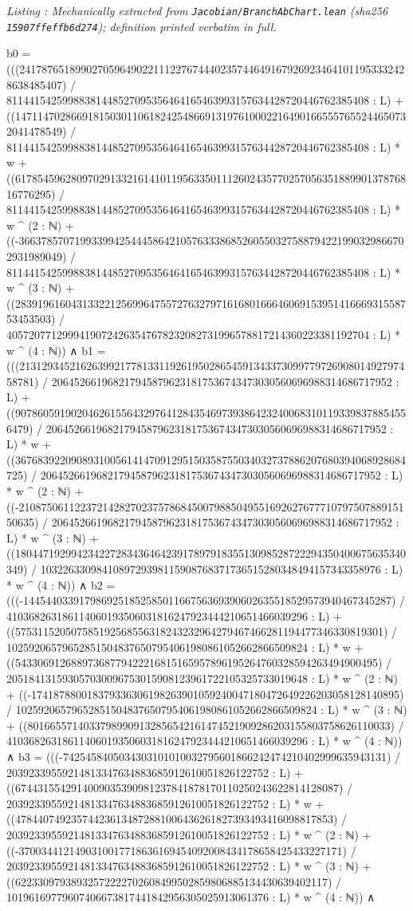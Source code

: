 \documentclass[a4paper,11pt]{article}
\newcounter{leanlisting}
\newenvironment{leanlisting}[2]{%
  \refstepcounter{leanlisting}\label{#2}%
  \begin{center}\textit{\small Listing \theleanlisting: #1}\end{center}%
  \Verbatim[breaklines=true,breakanywhere=true,fontsize=\footnotesize,frame=single,framesep=4pt,rulecolor=\color{gray!50},fillcolor=\color{gray!5}]%
}{%
  \endVerbatim%
}
\theoremstyle{plain}
\theoremstyle{definition}
\theoremstyle{remark}
\begin{document}
\begin{leanlisting}{Mechanically extracted from \texttt{Jacobian/BranchAbChart.lean} (sha256 \texttt{15907ffeffb6d274}); definition printed verbatim in full.}{lst:def-chartclass}
      b0 = (((2417876518990270596490221112276744402357446491679269234641011953332428638485407) / 81144154259988381448527095356464165463993157634428720446762385408 : L) + ((14711470286691815030110618242548669131976100022164901665557655244650732041478549) / 81144154259988381448527095356464165463993157634428720446762385408 : L) * w + ((617854596280970291332161410119563350111260243577025705635188990137876816776295) / 81144154259988381448527095356464165463993157634428720446762385408 : L) * w ^ (2 : ℕ) + ((-3663785707199339942544458642105763338685260550327588794221990329866702931989049) / 81144154259988381448527095356464165463993157634428720446762385408 : L) * w ^ (3 : ℕ) + ((283919616043133221256996475572763279716168016664606915395141666931558753453503) / 40572077129994190724263547678232082731996578817214360223381192704 : L) * w ^ (4 : ℕ)) ∧
      b1 = (((21312934521626399217781331192619502865459134337309977972690801492797458781) / 2064526619682179458796231817536743473030560696988314686717952 : L) + ((90786059190204626155643297641284354697393864232400683101193398378854556479) / 2064526619682179458796231817536743473030560696988314686717952 : L) * w + ((3676839220908931005614147091295150358755034032737886207680394068928684725) / 2064526619682179458796231817536743473030560696988314686717952 : L) * w ^ (2 : ℕ) + ((-21087506112237214282702375786845007988504955169262767771079750788915150635) / 2064526619682179458796231817536743473030560696988314686717952 : L) * w ^ (3 : ℕ) + ((1804471929942342272834364642391789791835513098528722294350400675635340349) / 1032263309841089729398115908768371736515280348494157343358976 : L) * w ^ (4 : ℕ)) ∧
      b2 = (((-144544033917986925185258501166756369390602635518529573940467345287) / 410368263186114060193506031816247923444210651466039296 : L) + ((575311520507585192568556318243232964279467466281194477346330819301) / 102592065796528515048376507954061980861052662866509824 : L) * w + ((54330691268897368779422216815165957896195264760328594263494900495) / 205184131593057030096753015908123961722105325733019648 : L) * w ^ (2 : ℕ) + ((-174187880018379336306198263901059240047180472649226203058128140895) / 102592065796528515048376507954061980861052662866509824 : L) * w ^ (3 : ℕ) + ((80166557140337989909132856542161474521909286203155803758626110033) / 410368263186114060193506031816247923444210651466039296 : L) * w ^ (4 : ℕ)) ∧
      b3 = (((-7425458405034303101010032795601866242474210402999635943131) / 20392339559214813347634883685912610051826122752 : L) + ((6744315542914009035390981237841878170110250243622814128087) / 20392339559214813347634883685912610051826122752 : L) * w + ((478440749235744236134872881006436261827393493416098817853) / 20392339559214813347634883685912610051826122752 : L) * w ^ (2 : ℕ) + ((-3700344121490310017718636169454092008434178658425433227171) / 20392339559214813347634883685912610051826122752 : L) * w ^ (3 : ℕ) + ((62233097938932572222702608499502859806885134430639402117) / 10196169779607406673817441842956305025913061376 : L) * w ^ (4 : ℕ)) ∧

\end{leanlisting}
\end{document}
